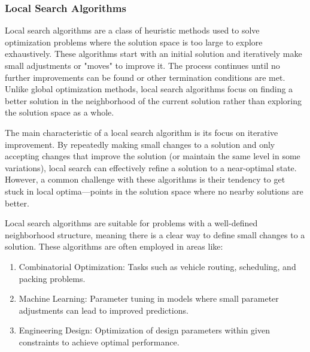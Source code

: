 \documentclass[
]{article}
\begin{document}


\hypertarget{local-search-algorithms}{%
  \subsubsection{Local Search Algorithms}\label{local-search-algorithms}}

Local search algorithms are a class of heuristic methods used to solve optimization problems where the solution space is too large to explore exhaustively. These algorithms start with an initial solution and iteratively make small adjustments or "moves" to improve it. The process continues until no further improvements can be found or other termination conditions are met. Unlike global optimization methods, local search algorithms focus on finding a better solution in the neighborhood of the current solution rather than exploring the solution space as a whole.

The main characteristic of a local search algorithm is its focus on iterative improvement. By repeatedly making small changes to a solution and only accepting changes that improve the solution (or maintain the same level in some variations), local search can effectively refine a solution to a near-optimal state. However, a common challenge with these algorithms is their tendency to get stuck in local optima—points in the solution space where no nearby solutions are better.

Local search algorithms are suitable for problems with a well-defined neighborhood structure, meaning there is a clear way to define small changes to a solution. These algorithms are often employed in areas like:

\begin{enumerate}
  \item Combinatorial Optimization: Tasks such as vehicle routing, scheduling, and packing problems.
  \item Machine Learning: Parameter tuning in models where small parameter adjustments can lead to improved predictions.
  \item Engineering Design: Optimization of design parameters within given constraints to achieve optimal performance.
\end{enumerate}
\end{document}
